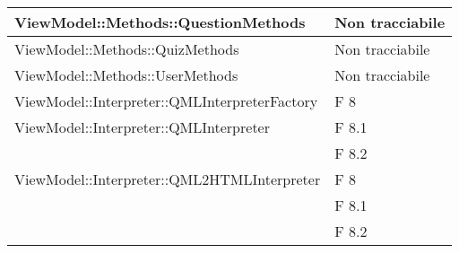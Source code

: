 \begin{longtable}{p{}p{}}

\midrule
ViewModel::Methods::QuestionMethods	& Non tracciabile\\
\midrule
ViewModel::Methods::QuizMethods	& Non tracciabile\\
\midrule
ViewModel::Methods::UserMethods	& Non tracciabile\\


\midrule
ViewModel::Interpreter::QMLInterpreterFactory	& F 8\\
												
\midrule
ViewModel::Interpreter::QMLInterpreter	& F 8.1\\
										& F 8.2\\
\midrule
ViewModel::Interpreter::QML2HTMLInterpreter	& F 8\\
											& F 8.1\\
											& F 8.2\\
\midrule
							
	\end{longtable}			
	\newpage
